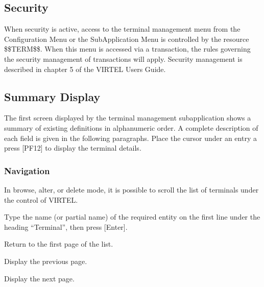 \documentclass[letterpaper,10pt,english]{sphinxmanual}
\begin{document}
\subsection{Security}
\label{\detokenize{connectivity_guide:index-99}}\label{\detokenize{connectivity_guide:id51}}
\sphinxAtStartPar
When security is active, access to the terminal management menu from the Configuration Menu or the Sub\sphinxhyphen{}Application Menu is controlled by the resource \$\$TERM\$\$. When this menu is accessed via a transaction, the rules governing the security management of transactions will apply. Security management is described in chapter 5 of the VIRTEL Users Guide.

\ignorespaces 

\subsection{Summary Display}
\label{\detokenize{connectivity_guide:index-100}}\label{\detokenize{connectivity_guide:id52}}
\sphinxAtStartPar
The first screen displayed by the terminal management sub\sphinxhyphen{}application shows a summary of existing definitions in alphanumeric order. A complete description of each field is given in the following paragraphs. Place the cursor under an entry a press {[}PF12{]} to display the terminal details.

\sphinxAtStartPar
{}

\ignorespaces 

\subsubsection{Navigation}
\label{\detokenize{connectivity_guide:index-101}}\label{\detokenize{connectivity_guide:id53}}
\sphinxAtStartPar
In browse, alter, or delete mode, it is possible to scroll the list of terminals under the control of VIRTEL.
\begin{description}
\sphinxAtStartPar
Type the name (or partial name) of the required entity on the first line under the heading “Terminal”, then press {[}Enter{]}.

\sphinxlineitem{{[}PF6{]}}
\sphinxAtStartPar
Return to the first page of the list.

\sphinxlineitem{{[}PF7{]}}
\sphinxAtStartPar
Display the previous page.

\sphinxlineitem{{[}PF8{]}}
\sphinxAtStartPar
Display the next page.

\end{description}
\end{document}
